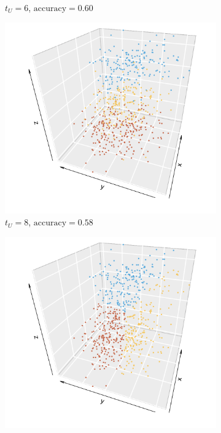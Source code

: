 \documentclass[10pt,journal,compsoc]{IEEEtran}
\numberwithin{equation}{section}
\begin{document}
\begin{figure}[htbp]
\begin{subfigure}{.49\columnwidth}
\caption{$t_U = 6$, $\text{accuracy} = 0.60$}
\label{12:3}
\end{subfigure}
\begin{subfigure}{.49\columnwidth}
\includegraphics[width=\columnwidth]{real_8.png}%
\caption{$t_U = 8$, $\text{accuracy} = 0.58$}
\end{subfigure}
\begin{subfigure}{.49\columnwidth}
\includegraphics[width=\columnwidth]{real_8_kmeans.png}%

\end{subfigure}
\end{figure}
\end{document}
